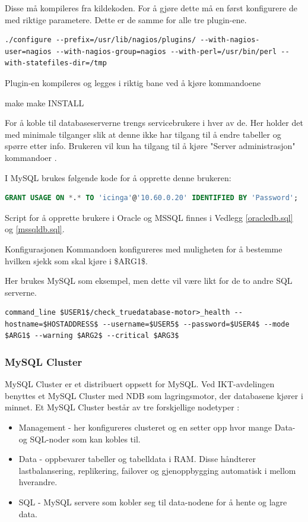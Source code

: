 Disse må kompileres fra kildekoden. For å gjøre dette må en først konfigurere de med riktige parametere. Dette er de samme for alle tre plugin-ene.

\begin{lstlisting}[style=example]
./configure --prefix=/usr/lib/nagios/plugins/ --with-nagios-user=nagios --with-nagios-group=nagios --with-perl=/usr/bin/perl --with-statefiles-dir=/tmp
\end{lstlisting}

Plugin-en kompileres og legges i riktig bane ved å kjøre kommandoene

make
make INSTALL

For å koble til databaseserverne trengs servicebrukere i hver av de. Her holder det med minimale tilganger slik at denne ikke har tilgang til å endre tabeller og spørre etter info. Brukeren vil kun ha tilgang til å kjøre "Server administrasjon" kommandoer \cite{mysqlpriv}.

I MySQL brukes følgende kode for å opprette denne brukeren:
\begin{lstlisting}[language=SQL,style=example]
GRANT USAGE ON *.* TO 'icinga'@'10.60.0.20' IDENTIFIED BY 'Password';
\end{lstlisting}

Script for å opprette brukere i Oracle og MSSQL finnes i Vedlegg \ref{oracledb.sql} og \ref{mssqldb.sql}.

Konfigurasjonen
Kommandoen konfigureres med muligheten for å bestemme hvilken sjekk som skal kjøre i \$ARG1\$.

Her brukes MySQL som eksempel, men dette vil være likt for de to andre SQL serverne. 
\begin{lstlisting}[style=example]
    command_line $USER1$/check_truedatabase-motor>_health --hostname=$HOSTADDRESS$ --username=$USER5$ --password=$USER4$ --mode $ARG1$ --warning $ARG2$ --critical $ARG3$
\end{lstlisting}

\subsubsection{MySQL Cluster}

MySQL Cluster er et distribuert oppsett for MySQL. Ved IKT-avdelingen benyttes et MySQL Cluster med NDB som lagringsmotor, der databasene kjører i minnet. Et MySQL Cluster består av tre forskjellige nodetyper \cite{ndbinformation}:

\begin{itemize}
	\item Management - her konfigureres clusteret og en setter opp hvor mange Data- og SQL-noder som kan kobles til.
	\item Data - oppbevarer tabeller og tabelldata i RAM. Disse håndterer lastbalansering, replikering, failover og gjenoppbygging automatisk i mellom hverandre.
	\item SQL - MySQL servere som kobler seg til data-nodene for å hente og lagre data.
\end{itemize}


